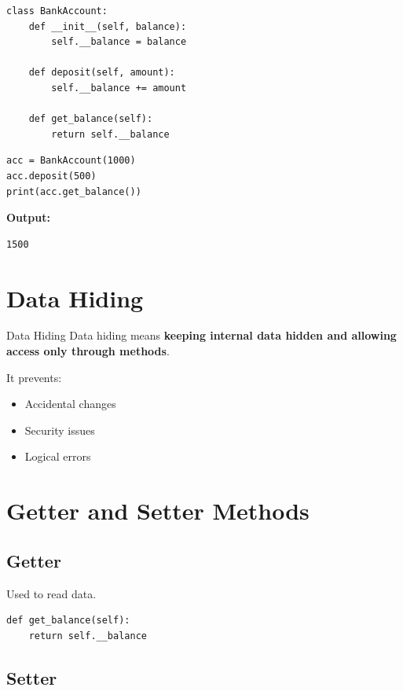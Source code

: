 \begin{verbatim}
class BankAccount:
    def __init__(self, balance):
        self.__balance = balance

    def deposit(self, amount):
        self.__balance += amount

    def get_balance(self):
        return self.__balance
\end{verbatim}

\begin{verbatim}
acc = BankAccount(1000)
acc.deposit(500)
print(acc.get_balance())
\end{verbatim}

\textbf{Output:}
\begin{verbatim}
1500
\end{verbatim}

\section{Data Hiding}

\begin{definition}{Data Hiding}
Data hiding means \textbf{keeping internal data hidden and allowing access only through methods}.
\end{definition}

It prevents:
\begin{itemize}
    \item Accidental changes
    \item Security issues
    \item Logical errors
\end{itemize}

\section{Getter and Setter Methods}

\subsection{Getter}

Used to read data.

\begin{verbatim}
def get_balance(self):
    return self.__balance
\end{verbatim}

\subsection{Setter}

